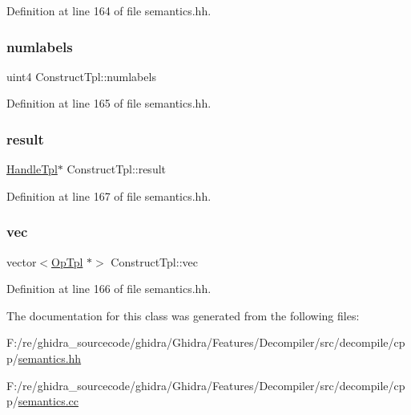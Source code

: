 Definition at line 164 of file semantics.\+hh.

\mbox{\label{class_construct_tpl_a493c686762fdacfa88a7508a9cd87896}} 
\subsubsection{\texorpdfstring{numlabels}{numlabels}}
{\footnotesize\ttfamily uint4 Construct\+Tpl\+::numlabels\hspace{0.3cm}{\ttfamily [protected]}}



Definition at line 165 of file semantics.\+hh.

\mbox{\label{class_construct_tpl_a81f6345fc9882da42d0960f11634c2d9}} 
\subsubsection{\texorpdfstring{result}{result}}
{\footnotesize\ttfamily \mbox{\hyperlink{class_handle_tpl}{Handle\+Tpl}}$\ast$ Construct\+Tpl\+::result\hspace{0.3cm}{\ttfamily [protected]}}



Definition at line 167 of file semantics.\+hh.

\mbox{\label{class_construct_tpl_a253e9fe8590d5675395612f7afb3f5f1}} 
\subsubsection{\texorpdfstring{vec}{vec}}
{\footnotesize\ttfamily vector$<$\mbox{\hyperlink{class_op_tpl}{Op\+Tpl}} $\ast$$>$ Construct\+Tpl\+::vec\hspace{0.3cm}{\ttfamily [protected]}}



Definition at line 166 of file semantics.\+hh.



The documentation for this class was generated from the following files\+:\begin{DoxyCompactItemize}
\item 
F\+:/re/ghidra\+\_\+sourcecode/ghidra/\+Ghidra/\+Features/\+Decompiler/src/decompile/cpp/\mbox{\hyperlink{semantics_8hh}{semantics.\+hh}}\item 
F\+:/re/ghidra\+\_\+sourcecode/ghidra/\+Ghidra/\+Features/\+Decompiler/src/decompile/cpp/\mbox{\hyperlink{semantics_8cc}{semantics.\+cc}}\end{DoxyCompactItemize}
